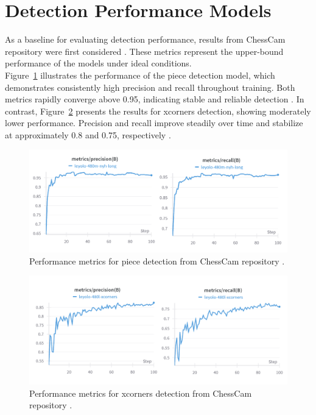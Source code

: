 \section{Detection Performance Models}

As a baseline for evaluating detection performance, results from ChessCam repository were first considered \cite{github:chesscam}. These metrics represent the upper-bound performance of the models under ideal conditions. \\

Figure~\ref{fig:chesscam-piece-metrics} illustrates the performance of the piece detection model, which demonstrates consistently high precision and recall throughout training. Both metrics rapidly converge above 0.95, indicating stable and reliable detection \cite{wandb:piece-detection}. In contrast, Figure~\ref{fig:chesscam-xcorners-metrics} presents the results for xcorners detection, showing moderately lower performance. Precision and recall improve steadily over time and stabilize at approximately 0.8 and 0.75, respectively \cite{wandb:xcorner-detection}.

\begin{figure}[H]
\centering
\includegraphics[width=\textwidth]{figures/results/machine-learning/piece-metrics.png}
\caption{Performance metrics for piece detection from ChessCam repository \cite{wandb:piece-detection}.}
\label{fig:chesscam-piece-metrics}
\end{figure}

\begin{figure}[H]
\centering
\includegraphics[width=\textwidth]{figures/results/machine-learning/xcorners-metrics.png}
\caption{Performance metrics for xcorners detection from ChessCam repository \cite{wandb:xcorner-detection}.}
\label{fig:chesscam-xcorners-metrics}
\end{figure}



